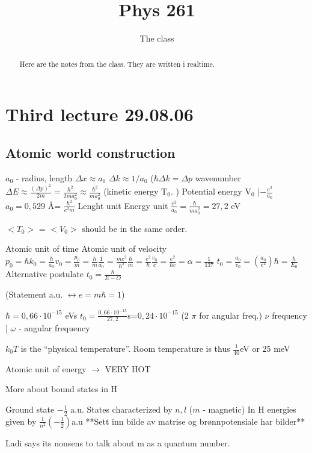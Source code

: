 \documentclass[a4paper,10pt]{report}
\title{Phys 261}
\author{The class}
\begin{document}
\maketitle

\begin{abstract}
Here are the notes from the class. They are written i realtime.
\end{abstract}
\section{Third lecture 29.08.06}
\subsection{Atomic world construction}
$a_0$ - radius, length
$\Delta x \approx a_0$ $\Delta k \approx 1/a_0$
($\hbar \Delta k = \Delta p$ wavenumber
$\Delta E \approx \frac{(\Delta p )^2}{2m} = \frac{\hbar ^2}{2ma_0^2} \approx \frac{\hbar ^2}{ma_0^2}$ (kinetic energy T$_0$. )
Potential energy V$_0$
$|-\frac{e^2}{a_0}$
$a_0 = 0,529$ \AA = $\frac{\hbar^2}{e^2m}$ Lenght unit
Energy unit $\frac{e^2}{a_0} = \frac{\hbar}{ma_0^2} = 27,2$ eV

$<T_0>$ = $<V_0>$ should be in the same order.

Atomic unit of time
Atomic unit of velocity $p_0 = \hbar k_0 = \frac{\hbar}{a_0}
v_0 = \frac{p_0}{m} = \frac{\hbar}{m}\frac{1}{a_0} = \frac{me^2}{\hbar ^2}\frac{\hbar}{m} = \frac{e^2}{\hbar}
\frac{v_0}{c} = \frac{e^2}{\hbar c} = \alpha = \frac{1}{137}$
$t_0 =\frac{a_0}{v_0} = (\frac{a_0}{e^2}) \hbar = \frac{\hbar}{E_0}$
Alternative postulate $t_0 = \frac{\hbar}{E-O}$

(Statement a.u. $\longleftrightarrow e = m \hbar = 1$)

$\hbar = 0,66 \cdot 10^{-15}$ eVs $t_0 = \frac{0,66 \cdot 10^{-15}}{27,2}$s=$0,24 \cdot 10^{-15}$
 (2 $\pi$ for angular freq.)
$\nu$ frequency | $\omega$ - angular frequency

$k_0 T$ is the ``physical temperature''.
Room temperature is thus $\frac{1}{40}$eV or 25 meV

Atomic unit of energy $\longrightarrow$ VERY HOT

More about bound states in H

Ground state $-\frac{1}{2}$ a.u.
States characterized by $n, l$ ($m$ - magnetic)
In H energies given by $\frac{1}{n^2}(-\frac{1}{2})$a.u
 **Sett inn bilde av matrise og brønnpotensiale har bilder**

Ladi says its nonsens to talk about m as a quantum number.
\end{document}
